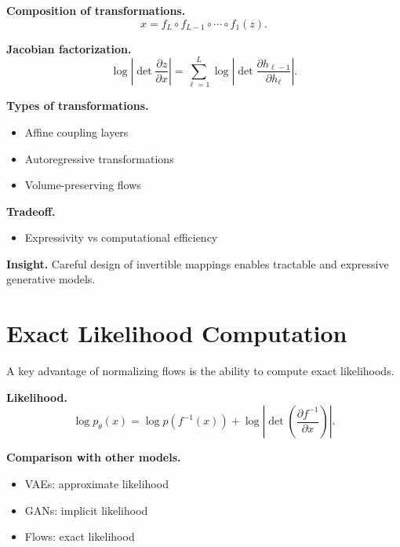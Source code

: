 \medskip

\noindent
\textbf{Composition of transformations.}
\[
x = f_L \circ f_{L-1} \circ \cdots \circ f_1(z).
\]

\medskip

\noindent
\textbf{Jacobian factorization.}
\[
\log \left| \det \frac{\partial z}{\partial x} \right|
=
\sum_{\ell=1}^L
\log \left| \det \frac{\partial h_{\ell-1}}{\partial h_\ell} \right|.
\]

\medskip

\noindent
\textbf{Types of transformations.}
\begin{itemize}
    \item Affine coupling layers
    \item Autoregressive transformations
    \item Volume-preserving flows
\end{itemize}

\medskip

\noindent
\textbf{Tradeoff.}
\begin{itemize}
    \item Expressivity vs computational efficiency
\end{itemize}

\medskip

\noindent
\textbf{Insight.}  
Careful design of invertible mappings enables tractable and expressive generative models.

\section{Exact Likelihood Computation}

A key advantage of normalizing flows is the ability to compute exact likelihoods.

\medskip

\noindent
\textbf{Likelihood.}
\[
\log p_\theta(x)
=
\log p(f^{-1}(x))
+
\log \left| \det \left( \frac{\partial f^{-1}}{\partial x} \right) \right|.
\]

\medskip

\noindent
\textbf{Comparison with other models.}
\begin{itemize}
    \item VAEs: approximate likelihood
    \item GANs: implicit likelihood
    \item Flows: exact likelihood
\end{itemize}

\medskip


